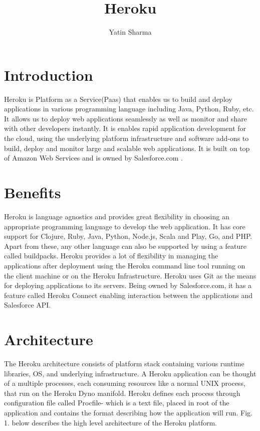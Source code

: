 \documentclass[9pt,twocolumn,twoside]{../../styles/osajnl}
\title{Heroku}
\author[1,*, +]{Yatin Sharma}
\affil[1]{School of Informatics and Computing, Bloomington, IN 47408, U.S.A.}
\affil[*]{Corresponding authors: yatins@indiana.edu}
\affil[+]{HID - S17-IR-2034}
\begin{document}
\maketitle

\section{Introduction}
	Heroku\cite{Heroku} is Platform as a Service(Paas)\cite{PaaS} that enables us
	to build and deploy applications in various programming language including Java,
	Python, Ruby, etc. It allows us to deploy web applications seamlessly as well as
	monitor and share with other developers instantly. It is enables rapid
	application development for the cloud, using the underlying platform
	infrastructure and software add-ons to build, deploy and monitor large and
	scalable web applications. It is built on top of Amazon Web Services and is owned
	by Salesforce.com \cite{Salesforce}. 
	

	
\section{Benefits}
	Heroku is language agnostics and provides great flexibility in choosing an
	appropriate programming language to develop the web application. It has core
	support for Clojure, Ruby, Java, Python, Node.js, Scala and Play, Go, and PHP.
	Apart from these, any other language can also be supported by using a feature
	called buildpacks. Heroku provides a lot of flexibility in managing the
	applications after deployment using the Heroku command line tool running on the
	client machine or on the Heroku Infrastructure. Heroku uses Git\cite{Git} as the
	means for deploying applications to its servers. Being owned by
	Salesforce.com\cite{Salesforce}, it has a feature called Heroku Connect enabling
	interaction between the applications and Salesforce API.

	\section{Architecture}
	The Heroku architecture consists of platform stack containing various runtime
	libraries, OS, and underlying infrastructure. A Heroku application can be
	thought of a multiple processes, each consuming resources like a normal UNIX
	process, that run on the Heroku Dyno manifold. Heroku defines each process
	through configuration file called Procfile- which is a text file, placed in root
	of the application and contains the format describing how the application will
	run. Fig. 1. below describes the high level architecture of the Heroku platform.
	
\end{document}
